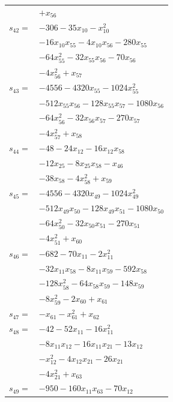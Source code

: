 \begin{longtable}{@{}r@{\;}l@{}}
 & \(\displaystyle +x_{56}\) \\[3pt]
\(s_{42}=\) & \(\displaystyle -306 -35x_{10} -x_{10}^{2}\) \\
 & \(\displaystyle -16x_{10}x_{55} -4x_{10}x_{56} -280x_{55}\) \\
 & \(\displaystyle -64x_{55}^{2} -32x_{55}x_{56} -70x_{56}\) \\
 & \(\displaystyle -4x_{56}^{2} +x_{57}\) \\[3pt]
\(s_{43}=\) & \(\displaystyle -4556 -4320x_{55} -1024x_{55}^{2}\) \\
 & \(\displaystyle -512x_{55}x_{56} -128x_{55}x_{57} -1080x_{56}\) \\
 & \(\displaystyle -64x_{56}^{2} -32x_{56}x_{57} -270x_{57}\) \\
 & \(\displaystyle -4x_{57}^{2} +x_{58}\) \\[3pt]
\(s_{44}=\) & \(\displaystyle -48 -24x_{12} -16x_{12}x_{58}\) \\
 & \(\displaystyle -12x_{25} -8x_{25}x_{58} -x_{46}\) \\
 & \(\displaystyle -38x_{58} -4x_{58}^{2} +x_{59}\) \\[3pt]
\(s_{45}=\) & \(\displaystyle -4556 -4320x_{49} -1024x_{49}^{2}\) \\
 & \(\displaystyle -512x_{49}x_{50} -128x_{49}x_{51} -1080x_{50}\) \\
 & \(\displaystyle -64x_{50}^{2} -32x_{50}x_{51} -270x_{51}\) \\
 & \(\displaystyle -4x_{51}^{2} +x_{60}\) \\[3pt]
\(s_{46}=\) & \(\displaystyle -682 -70x_{11} -2x_{11}^{2}\) \\
 & \(\displaystyle -32x_{11}x_{58} -8x_{11}x_{59} -592x_{58}\) \\
 & \(\displaystyle -128x_{58}^{2} -64x_{58}x_{59} -148x_{59}\) \\
 & \(\displaystyle -8x_{59}^{2} -2x_{60} +x_{61}\) \\[3pt]
\(s_{47}=\) & \(\displaystyle -x_{61} -x_{61}^{2} +x_{62}\) \\[3pt]
\(s_{48}=\) & \(\displaystyle -42 -52x_{11} -16x_{11}^{2}\) \\
 & \(\displaystyle -8x_{11}x_{12} -16x_{11}x_{21} -13x_{12}\) \\
 & \(\displaystyle -x_{12}^{2} -4x_{12}x_{21} -26x_{21}\) \\
 & \(\displaystyle -4x_{21}^{2} +x_{63}\) \\[3pt]
\(s_{49}=\) & \(\displaystyle -950 -160x_{11}x_{63} -70x_{12}\) \\

\end{longtable}

